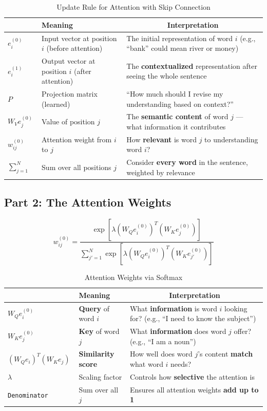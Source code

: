 \documentclass[12pt]{extarticle}
\begin{document}
\begin{table}[h]
\centering
\begin{tabular}{>{\tt}l l p{8cm}}
\toprule
\multicolumn{1}{c}{Symbol} & Meaning & \multicolumn{1}{c}{Interpretation} \\
\midrule
$e_i^{(0)}$ & Input vector at position $i$ (before attention) & The initial representation of word $i$ (e.g., ``bank'' could mean river or money) \\
$e_i^{(1)}$ & Output vector at position $i$ (after attention) & The \textbf{contextualized} representation after seeing the whole sentence \\
$P$ & Projection matrix (learned) & ``How much should I revise my understanding based on context?'' \\
$W_V e_j^{(0)}$ & Value of position $j$ & The \textbf{semantic content} of word $j$ — what information it contributes \\
$w_{ij}^{(0)}$ & Attention weight from $i$ to $j$ & How \textbf{relevant} is word $j$ to understanding word $i$? \\
$\sum_{j=1}^{N}$ & Sum over all positions $j$ & Consider \textbf{every word} in the sentence, weighted by relevance \\
\bottomrule
\end{tabular}
\caption{Update Rule for Attention with Skip Connection}
\end{table}

\subsection{Part 2: The Attention Weights}
\[
w_{ij}^{(0)} = \frac{\exp\left[\lambda (W_Q e_i^{(0)})^T (W_K e_j^{(0)})\right]}{\sum_{j'=1}^{N} \exp\left[\lambda (W_Q e_i^{(0)})^T (W_K e_{j'}^{(0)})\right]}
\]

\begin{table}[h]
\centering
\begin{tabular}{>{\tt}l l p{8cm}}
\toprule
\multicolumn{1}{c}{Symbol} & Meaning & \multicolumn{1}{c}{Interpretation} \\
\midrule
$W_Q e_i^{(0)}$ & \textbf{Query} of word $i$ & What \textbf{information} is word $i$ looking for? (e.g., ``I need to know the subject'') \\
$W_K e_j^{(0)}$ & \textbf{Key} of word $j$ & What \textbf{information} does word $j$ offer? (e.g., ``I am a noun'') \\
$(W_Q e_i)^T (W_K e_j)$ & \textbf{Similarity score} & How well does word $j$'s content \textbf{match} what word $i$ needs? \\
$\lambda$ & Scaling factor & Controls how \textbf{selective} the attention is \\
Denominator & Sum over all $j$ & Ensures all attention weights \textbf{add up to 1} \\
\bottomrule
\end{tabular}
\caption{Attention Weights via Softmax}
\end{table}
\end{document}
